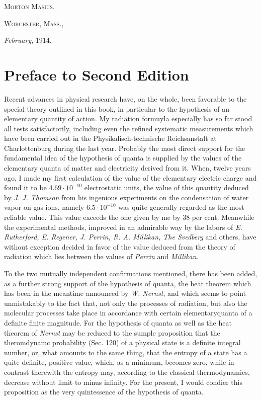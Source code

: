\documentclass[12pt,oneside]{book}
\begin{document}
\begin{flushright}
    \textsc{Morton Masius.}
\end{flushright} \par
\textsc{Worcester, Mass.,} \par
\textit{February}, 1914.

\chapter{Preface to Second Edition}
Recent advances in physical research have, on the whole, been favorable to the special theory outlined in this book, in particular to the hypothesis of an elementary quantity of action. My radiation formuyla especially has so far stood all tests satisfactorily, including even the refined systematic measurements which have been carried out in the Physikalisch-technische Reichsanstalt at Charlottenburg during the last year. Probably the most direct support for the fundamental idea of the hypothesis of quanta is supplied by the values of the elementary quanta of matter and electricity derived from it. When, twelve years ago, I made my first calculation of the value of the elementary electric charge and found it to be $4.69\cdot 10^{-10}$ electrostatic units, the value of this quantity deduced by \textit{J. J. Thomson} from his ingenious experiments on the condensation of water vapor on gas ions, namely $6.5\cdot 10^{-10}$ was quite generally regarded as the most reliable value. This value exceeds the one given by me by 38 per cent. Meanwhile the experimental methods, improved in an admirable way by the labors of \textit{E. Rutherford, E. Regener, J. Perrin, R. A. Millikan, The Svedberg} and others, have without exception decided in favor of the value deduced from the theory of radiation which lies between the values of \textit{Perrin} and \textit{Millikan.} \par

To the two mutually independent confirmations mentioned, there has been added, as a further strong support of the hypothesis of quanta, the heat theorem which has been in the meantime announced by \textit{W. Nernst}, and which seems to point unmistakably to the fact that, not only the processes of radiation, but also the molecular processes take place in accordance with certain elementaryquanta of a definite finite magnitude. For the hypothesis of quanta as well as the heat theorem of \textit{Nernst} may be reduced to the sumple proposition that the theromdynamc probability (Sec. 120) of a physical state is a definite integral number, or, what amounts to the same thing, that the entropy of a state has a quite definite, positive value, which, as a minimum, becomes zero, while in contrast therewith the entropy may, according to the classical thermodynamics, decrease without limit to minus infinity. For the present, I would condier this proposition as the very quintessence of the hypothesis of quanta. \par
\end{document}

